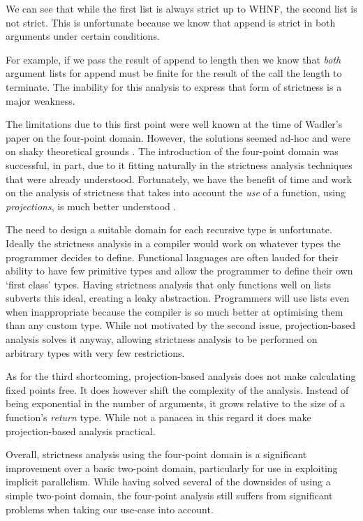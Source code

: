 We can see that while the first list is always strict up to WHNF, the second
list is not strict. This is unfortunate because we know that \<append\> is
strict in both arguments under certain conditions.

For example, if we pass the result of \<append\> to \<length\> then we know
that \emph{both} argument lists for \<append\> must be finite for the result
of the call the \<length\> to terminate. The inability for this analysis
to express that form of strictness is a major weakness.

The limitations due to this first point were well known at the time of Wadler's
paper on the four-point domain. However, the solutions seemed ad-hoc and were
on shaky theoretical grounds \citep{hughes1986strictness, hughes1987analysing}. The
introduction of the four-point domain was successful, in part, due to it fitting
naturally in the strictness analysis techniques that were already understood.
Fortunately, we have the benefit of time and work on the analysis of strictness that
takes into account the \emph{use} of a function, using \emph{projections}, is
much better understood \citep{hinze1995projection, SergeyDemand}.

The need to design a suitable domain for each recursive type is unfortunate.
Ideally the strictness analysis in a compiler would work on whatever types the
programmer decides to define. Functional languages are often lauded for their
ability to have few primitive types and allow the programmer to define their
own `first class' types.  Having strictness analysis that only functions well
on lists subverts this ideal, creating a leaky abstraction. Programmers will
use lists even when inappropriate because the compiler is so much better at
optimising them than any custom type. While not motivated by the second issue,
projection-based analysis solves it anyway, allowing strictness analysis to be
performed on arbitrary types with very few restrictions.

As for the third shortcoming, projection-based analysis does not make
calculating fixed points free. It does however shift the complexity of the
analysis. Instead of being exponential in the number of arguments, it grows
relative to the size of a function's \emph{return} type. While not a panacea in
this regard it does make projection-based analysis practical.

Overall, strictness analysis using the four-point domain is a significant
improvement over a basic two-point domain, particularly for use in exploiting
implicit parallelism. While having solved several of the downsides of using
a simple two-point domain, the four-point analysis still suffers from
significant problems when taking our use-case into account.
